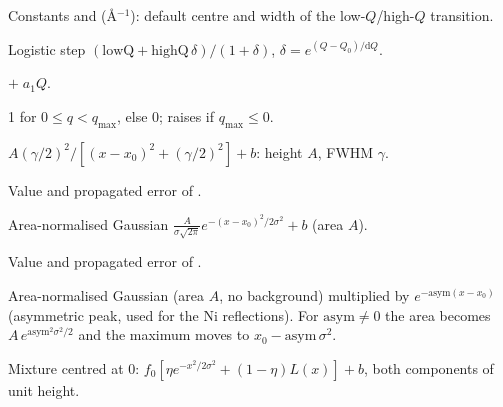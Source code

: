 \documentclass[11pt,a4paper]{article}
\begin{document}

Constants  and 
(\AA$^{-1}$): default centre and width of the low-$Q$/high-$Q$ transition.

  \newbeh
Logistic step $(\mathrm{lowQ}+\mathrm{highQ}\,\delta)/(1+\delta)$, $\delta = e^{(Q-Q_0)/\mathrm{d}Q}$.

 \newbeh
{} $+\;a_1Q$.

 
1 for $0\le q<q_\mathrm{max}$, else 0; raises if $q_\mathrm{max}\le0$.

$A(\gamma/2)^2/[(x-x_0)^2+(\gamma/2)^2] + b$: height $A$, FWHM $\gamma$.

 
Value and propagated error of .

Area-normalised Gaussian $\frac{A}{\sigma\sqrt{2\pi}}e^{-(x-x_0)^2/2\sigma^2}+b$ (area $A$).

Value and propagated error of .

Area-normalised Gaussian (area $A$, no background) multiplied by
$e^{-\mathrm{asym}(x-x_0)}$ (asymmetric peak, used for the Ni reflections).
For $\mathrm{asym}\neq0$ the area becomes $A\,e^{\mathrm{asym}^2\sigma^2/2}$
and the maximum moves to $x_0-\mathrm{asym}\,\sigma^2$.

Mixture centred at 0: $f_0[\eta e^{-x^2/2\sigma^2} + (1-\eta)L(x)] + b$,
both components of unit height.
\end{document}
